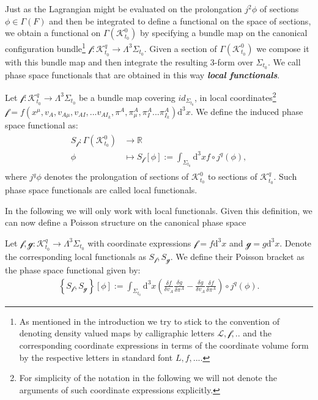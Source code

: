 Just as the Lagrangian might be evaluated on the prolongation $j^2\phi$ of sections $\phi \in \Gamma(F)$ and then be integrated to define a functional on the space of sections, we obtain a functional on $\Gamma(\mathcal{K}^0_{t_0})$ by specifying a bundle map on the canonical configuration bundle\footnote{As mentioned in the introduction we try to stick to the convention of denoting density valued maps by calligraphic letters $\mathcal{L}, \mathcal{f},..$ and the corresponding coordinate expressions in terms of the coordinate volume form by the respective letters in standard font $L,f,...$.} $\mathcal{f}: \mathcal{K}^q_{t_0} \rightarrow \Lambda^3\Sigma_{t_0}$. Given a section of $\Gamma(\mathcal{K}^0_{t_0})$ we compose it with this bundle map and then integrate the resulting 3-form over $\Sigma_{t_0}$. We call phase space functionals that are obtained in this way \textit{\textbf{local functionals}}.  
\begin{definition}
Let $\mathcal{f}: \mathcal{K}^q_{t_0} \rightarrow \Lambda^3\Sigma_{t_0} $ be a bundle map covering $id_{\Sigma_{t_0}}$, in local coordinates\footnote{For simplicity of the notation in the following we will not denote the arguments of such coordinate expressions explicitly.} $\mathcal{f} = f(x^{\mu},v_A,v_{A\mu},v_{AI}, ... v_{AI_k},\pi^A,\pi^A _{\mu}, \pi^A_I ... \pi^A_{I_k})\mathrm{d}^3x$. We define the induced phase space functional as:
\begin{align}
\begin{aligned}
    S_{\mathcal{f}} : \Gamma(\mathcal{K}^0_{t_0}) &\longrightarrow \mathbb{R}\\
    \phi &\longmapsto S_{\mathcal{f}}[\phi] := \int_{\Sigma_{t_0}} \mathrm{d}^3x f \circ j^q(\phi),
\end{aligned}
\end{align}
where $j^q\phi$ denotes the prolongation of sections of $\mathcal{K}^0_{t_0}$ to sections of $\mathcal{K}^q_{t_0}$. Such phase space functionals are called local functionals.
\end{definition}
In the following we will only work with local functionals. 
Given this definition, we can now define a Poisson structure on the canonical phase space 
\begin{definition}
Let $\mathcal{f},\mathcal{g} : \mathcal{K}^q_{t_0} \rightarrow \Lambda^3\Sigma_{t_0} $ with coordinate expressions $\mathcal{f} = f\mathrm{d}^3x$ and $\mathcal{g} = g\mathrm{d}^3x$. Denote the corresponding local functionals as $S_{\mathcal{f}}, S_{\mathcal{g}}$. We define their Poisson bracket as the phase space functional given by:
\begin{align}
\left \{ S_{\mathcal{f}}, S_{\mathcal{g}} \right \}[\phi] := \int _{\Sigma_{t_0}} \mathrm{d}^3x \left ( \frac{\delta f}{\delta v_A} \frac{\delta g}{\delta \pi^A} - \frac{\delta g}{\delta v_A} \frac{\delta f}{\delta \pi^A}     \right ) \circ j^q(\phi)  .
\end{align}
\end{definition}

